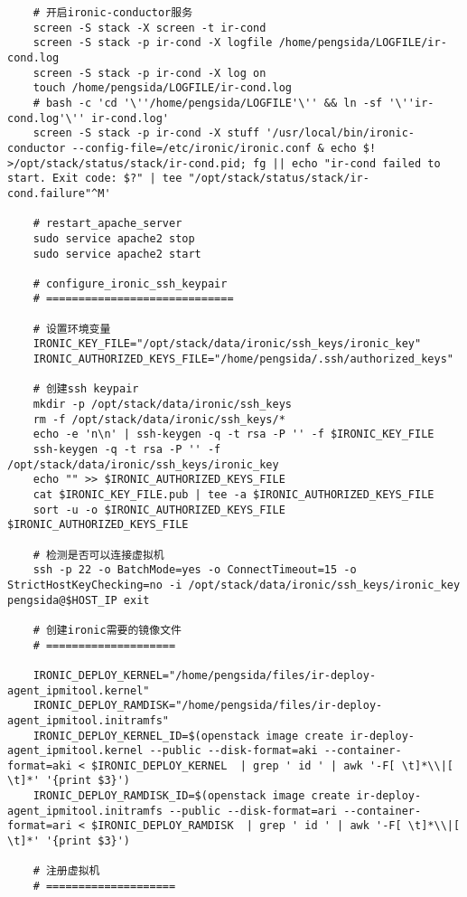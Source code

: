 \documentclass[a4paper,left=1.5cm,right=1.5cm,11pt]{article}
\begin{document}
\begin{lstlisting}
	# 开启ironic-conductor服务
	screen -S stack -X screen -t ir-cond
	screen -S stack -p ir-cond -X logfile /home/pengsida/LOGFILE/ir-cond.log
    screen -S stack -p ir-cond -X log on
	touch /home/pengsida/LOGFILE/ir-cond.log
    # bash -c 'cd '\''/home/pengsida/LOGFILE'\'' && ln -sf '\''ir-cond.log'\'' ir-cond.log'
	screen -S stack -p ir-cond -X stuff '/usr/local/bin/ironic-conductor --config-file=/etc/ironic/ironic.conf & echo $! >/opt/stack/status/stack/ir-cond.pid; fg || echo "ir-cond failed to start. Exit code: $?" | tee "/opt/stack/status/stack/ir-cond.failure"^M'

	# restart_apache_server
	sudo service apache2 stop
	sudo service apache2 start

	# configure_ironic_ssh_keypair
	# =============================
	
	# 设置环境变量
	IRONIC_KEY_FILE="/opt/stack/data/ironic/ssh_keys/ironic_key"
	IRONIC_AUTHORIZED_KEYS_FILE="/home/pengsida/.ssh/authorized_keys"

	# 创建ssh keypair
	mkdir -p /opt/stack/data/ironic/ssh_keys
	rm -f /opt/stack/data/ironic/ssh_keys/*
	echo -e 'n\n' | ssh-keygen -q -t rsa -P '' -f $IRONIC_KEY_FILE
	ssh-keygen -q -t rsa -P '' -f /opt/stack/data/ironic/ssh_keys/ironic_key
	echo "" >> $IRONIC_AUTHORIZED_KEYS_FILE
	cat $IRONIC_KEY_FILE.pub | tee -a $IRONIC_AUTHORIZED_KEYS_FILE
	sort -u -o $IRONIC_AUTHORIZED_KEYS_FILE $IRONIC_AUTHORIZED_KEYS_FILE
	
	# 检测是否可以连接虚拟机
	ssh -p 22 -o BatchMode=yes -o ConnectTimeout=15 -o StrictHostKeyChecking=no -i /opt/stack/data/ironic/ssh_keys/ironic_key pengsida@$HOST_IP exit

	# 创建ironic需要的镜像文件
	# ====================

	IRONIC_DEPLOY_KERNEL="/home/pengsida/files/ir-deploy-agent_ipmitool.kernel"
	IRONIC_DEPLOY_RAMDISK="/home/pengsida/files/ir-deploy-agent_ipmitool.initramfs"
	IRONIC_DEPLOY_KERNEL_ID=$(openstack image create ir-deploy-agent_ipmitool.kernel --public --disk-format=aki --container-format=aki < $IRONIC_DEPLOY_KERNEL  | grep ' id ' | awk '-F[ \t]*\\|[ \t]*' '{print $3}')
	IRONIC_DEPLOY_RAMDISK_ID=$(openstack image create ir-deploy-agent_ipmitool.initramfs --public --disk-format=ari --container-format=ari < $IRONIC_DEPLOY_RAMDISK  | grep ' id ' | awk '-F[ \t]*\\|[ \t]*' '{print $3}')

	# 注册虚拟机
	# ====================


\end{lstlisting}
\end{document}
